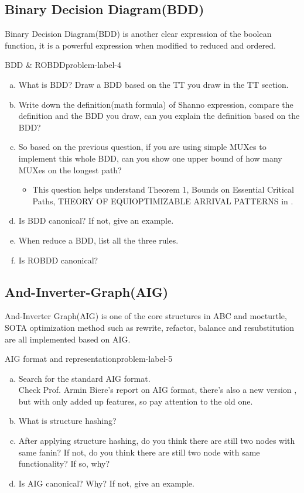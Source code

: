 \documentclass[main.tex]{subfiles}
\begin{document}
\subsection{Binary Decision Diagram(BDD)}
Binary Decision Diagram(BDD) is another clear expression of the boolean function, it is a powerful expression when modified to reduced and ordered.
\begin{problem}{BDD \& ROBDD}{problem-label-4}
\begin{enumerate}[(a)]
    \item What is BDD? Draw a BDD based on the TT you draw in the TT section.
    \item Write down the definition(math formula) of Shanno expression, compare the definition and the BDD you draw, can you explain the definition based on the BDD?
    \item So based on the previous question, if you are using simple MUXes to implement this whole BDD, can you show one upper bound of how many MUXes on the longest path?
    \begin{itemize}
        \item This question helps understand Theorem 1, Bounds on Essential Critical Paths, THEORY OF EQUIOPTIMIZABLE ARRIVAL PATTERNS in \cite{EnablingExactDelaySynthesis}.
    \end{itemize}
    \item Is BDD canonical? If not, give an example.
    \item When reduce a BDD, list all the three rules.
    \item Is ROBDD canonical?
\end{enumerate}
\end{problem}
\vspace*{4\baselineskip}

\subsection{And-Inverter-Graph(AIG)}
And-Inverter Graph(AIG) is one of the core structures in ABC and mocturtle, SOTA optimization method such as rewrite, refactor, balance and resubstitution are all implemented based on AIG.
\begin{problem}{AIG format and representation}{problem-label-5}
\begin{enumerate}[(a)]
    \item Search for the standard AIG format.\\
    Check Prof. Armin Biere's report \cite{AIGERFormat} on AIG format, there's also a new version \cite{Biere-FMV-TR-11-2}, but with only added up features, so pay attention to the old one.
    \item What is structure hashing? 
    \item After applying structure hashing, do you think there are still two nodes with same fanin? If not, do you think there are still two node with same functionality? If so, why?
    \item Is AIG canonical? Why? If not, give an example.
\end{enumerate}
\end{problem}
\vspace*{4\baselineskip}
\end{document}
